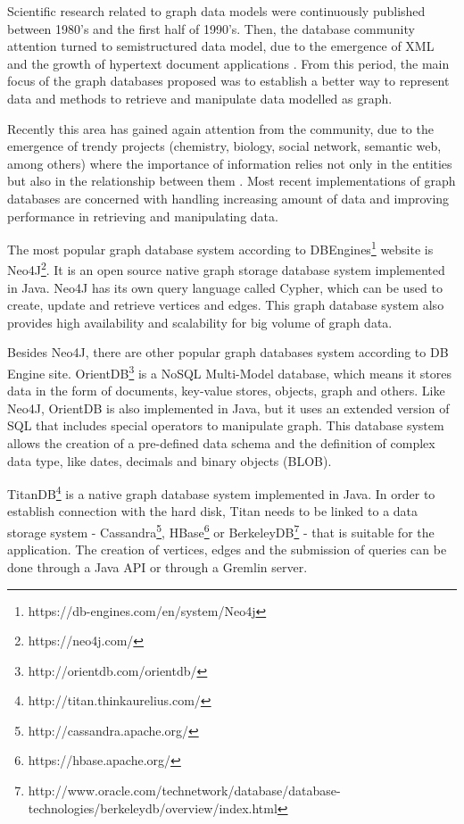 Scientific research related to graph data models were continuously published between 1980's and the first half of 1990's. Then, the database community attention turned to semistructured data model, due to the emergence of XML and the growth of hypertext document applications \cite{Angles2008}. From this period, the main focus of the graph databases proposed was to establish a better way to represent data and methods to retrieve and manipulate data modelled as graph.

Recently this area has gained again attention from the community, due to the emergence of trendy projects (chemistry, biology, social network, semantic web, among others) where the importance of information relies not only in the entities but also in the relationship between them \cite{Angles2012}. Most recent implementations of graph databases are concerned with handling increasing amount of data and improving performance in retrieving and manipulating data.

The most popular graph database system according to DBEngines\footnote{https://db-engines.com/en/system/Neo4j} website is Neo4J\footnote{https://neo4j.com/}. It is an open source native graph storage database system implemented in Java. Neo4J has its own query language called Cypher, which can be used to create, update and retrieve vertices and edges. This graph database system also provides high availability and scalability for big volume of graph data.

Besides Neo4J, there are other popular graph databases system according to DB Engine site. OrientDB\footnote{http://orientdb.com/orientdb/} is a NoSQL Multi-Model database, which means it stores data in the form of documents, key-value stores, objects, graph and others. Like Neo4J, OrientDB is also implemented in Java, but it uses an extended version of SQL that includes special operators to manipulate graph. This database system allows the creation of a pre-defined data schema and the definition of complex data type, like dates, decimals and binary objects (BLOB).

TitanDB\footnote{http://titan.thinkaurelius.com/} is a native graph database system implemented in Java. In order to establish connection with the hard disk, Titan needs to be linked to a data storage system - Cassandra\footnote{http://cassandra.apache.org/}, HBase\footnote{https://hbase.apache.org/} or BerkeleyDB\footnote{http://www.oracle.com/technetwork/database/database-technologies/berkeleydb/overview/index.html} - that is suitable for the application. The creation of vertices, edges and the submission of queries can be done through a Java API or through a Gremlin server.

